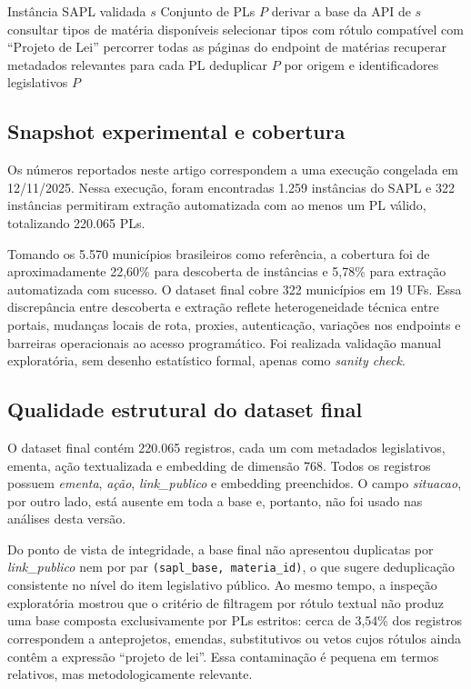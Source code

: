\begin{algorithm}[H]
\caption{Extração exaustiva de PLs}
\label{alg:scrapper-v2}
\begin{algorithmic}[1]
\Require Instância SAPL validada $s$
\Ensure Conjunto de PLs $P$
\State derivar a base da API de $s$
\State consultar tipos de matéria disponíveis
\State selecionar tipos com rótulo compatível com ``Projeto de Lei''
  \State percorrer todas as páginas do endpoint de matérias
  \State recuperar metadados relevantes para cada PL
\EndFor
\State deduplicar $P$ por origem e identificadores legislativos
\State \Return $P$
\end{algorithmic}
\end{algorithm}

\subsection{Snapshot experimental e cobertura}

Os números reportados neste artigo correspondem a uma execução congelada em 12/11/2025. Nessa execução, foram encontradas 1.259 instâncias do SAPL e 322 instâncias permitiram extração automatizada com ao menos um PL válido, totalizando 220.065 PLs.

Tomando os 5.570 municípios brasileiros como referência, a cobertura foi de aproximadamente 22,60\% para descoberta de instâncias e 5,78\% para extração automatizada com sucesso. O dataset final cobre 322 municípios em 19 UFs. Essa discrepância entre descoberta e extração reflete heterogeneidade técnica entre portais, mudanças locais de rota, proxies, autenticação, variações nos endpoints e barreiras operacionais ao acesso programático. Foi realizada validação manual exploratória, sem desenho estatístico formal, apenas como \textit{sanity check}.

\subsection{Qualidade estrutural do dataset final}

O dataset final contém 220.065 registros, cada um com metadados legislativos, ementa, ação textualizada e embedding de dimensão 768. Todos os registros possuem \textit{ementa}, \textit{ação}, \textit{link\_publico} e embedding preenchidos. O campo \textit{situacao}, por outro lado, está ausente em toda a base e, portanto, não foi usado nas análises desta versão.

Do ponto de vista de integridade, a base final não apresentou duplicatas por \textit{link\_publico} nem por par \texttt{(sapl\_base, materia\_id)}, o que sugere deduplicação consistente no nível do item legislativo público. Ao mesmo tempo, a inspeção exploratória mostrou que o critério de filtragem por rótulo textual não produz uma base composta exclusivamente por PLs estritos: cerca de 3,54\% dos registros correspondem a anteprojetos, emendas, substitutivos ou vetos cujos rótulos ainda contêm a expressão ``projeto de lei''. Essa contaminação é pequena em termos relativos, mas metodologicamente relevante.

